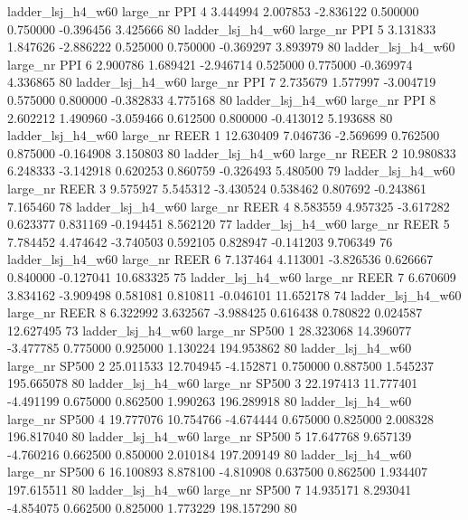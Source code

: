   ladder_lsj_h4_w60   large_nr      PPI                 4  3.444994  2.007853  -2.836122 0.500000 0.750000 -0.396456    3.425666 80
  ladder_lsj_h4_w60   large_nr      PPI                 5  3.131833  1.847626  -2.886222 0.525000 0.750000 -0.369297    3.893979 80
  ladder_lsj_h4_w60   large_nr      PPI                 6  2.900786  1.689421  -2.946714 0.525000 0.775000 -0.369974    4.336865 80
  ladder_lsj_h4_w60   large_nr      PPI                 7  2.735679  1.577997  -3.004719 0.575000 0.800000 -0.382833    4.775168 80
  ladder_lsj_h4_w60   large_nr      PPI                 8  2.602212  1.490960  -3.059466 0.612500 0.800000 -0.413012    5.193688 80
  ladder_lsj_h4_w60   large_nr     REER                 1 12.630409  7.046736  -2.569699 0.762500 0.875000 -0.164908    3.150803 80
  ladder_lsj_h4_w60   large_nr     REER                 2 10.980833  6.248333  -3.142918 0.620253 0.860759 -0.326493    5.480500 79
  ladder_lsj_h4_w60   large_nr     REER                 3  9.575927  5.545312  -3.430524 0.538462 0.807692 -0.243861    7.165460 78
  ladder_lsj_h4_w60   large_nr     REER                 4  8.583559  4.957325  -3.617282 0.623377 0.831169 -0.194451    8.562120 77
  ladder_lsj_h4_w60   large_nr     REER                 5  7.784452  4.474642  -3.740503 0.592105 0.828947 -0.141203    9.706349 76
  ladder_lsj_h4_w60   large_nr     REER                 6  7.137464  4.113001  -3.826536 0.626667 0.840000 -0.127041   10.683325 75
  ladder_lsj_h4_w60   large_nr     REER                 7  6.670609  3.834162  -3.909498 0.581081 0.810811 -0.046101   11.652178 74
  ladder_lsj_h4_w60   large_nr     REER                 8  6.322992  3.632567  -3.988425 0.616438 0.780822  0.024587   12.627495 73
  ladder_lsj_h4_w60   large_nr    SP500                 1 28.323068 14.396077  -3.477785 0.775000 0.925000  1.130224  194.953862 80
  ladder_lsj_h4_w60   large_nr    SP500                 2 25.011533 12.704945  -4.152871 0.750000 0.887500  1.545237  195.665078 80
  ladder_lsj_h4_w60   large_nr    SP500                 3 22.197413 11.777401  -4.491199 0.675000 0.862500  1.990263  196.289918 80
  ladder_lsj_h4_w60   large_nr    SP500                 4 19.777076 10.754766  -4.674444 0.675000 0.825000  2.008328  196.817040 80
  ladder_lsj_h4_w60   large_nr    SP500                 5 17.647768  9.657139  -4.760216 0.662500 0.850000  2.010184  197.209149 80
  ladder_lsj_h4_w60   large_nr    SP500                 6 16.100893  8.878100  -4.810908 0.637500 0.862500  1.934407  197.615511 80
  ladder_lsj_h4_w60   large_nr    SP500                 7 14.935171  8.293041  -4.854075 0.662500 0.825000  1.773229  198.157290 80
